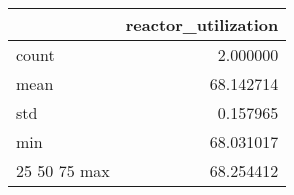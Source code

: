 \begin{tabular}{lr}
\toprule
 & reactor\_utilization \\
\midrule
count & 2.000000 \\
mean & 68.142714 \\
std & 0.157965 \\
min & 68.031017 \\
25%
50%
75%
max & 68.254412 \\
\bottomrule
\end{tabular}

